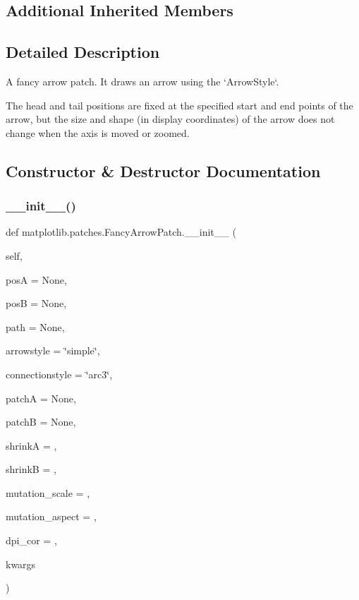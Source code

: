 \subsection*{Additional Inherited Members}


\subsection{Detailed Description}
\begin{DoxyVerb}A fancy arrow patch. It draws an arrow using the `ArrowStyle`.

The head and tail positions are fixed at the specified start and end points
of the arrow, but the size and shape (in display coordinates) of the arrow
does not change when the axis is moved or zoomed.
\end{DoxyVerb}
 

\subsection{Constructor \& Destructor Documentation}
\mbox{\label{classmatplotlib_1_1patches_1_1FancyArrowPatch_a88ac40d08aa4dfd3f50e747d8036cb14}} 
\subsubsection{\texorpdfstring{\+\_\+\+\_\+init\+\_\+\+\_\+()}{\_\_init\_\_()}}
{\footnotesize\ttfamily def matplotlib.\+patches.\+Fancy\+Arrow\+Patch.\+\_\+\+\_\+init\+\_\+\+\_\+ (\begin{DoxyParamCaption}\item[{}]{self,  }\item[{}]{posA = {\ttfamily None},  }\item[{}]{posB = {\ttfamily None},  }\item[{}]{path = {\ttfamily None},  }\item[{}]{arrowstyle = {\ttfamily \char`\"{}simple\char`\"{}},  }\item[{}]{connectionstyle = {\ttfamily \char`\"{}arc3\char`\"{}},  }\item[{}]{patchA = {\ttfamily None},  }\item[{}]{patchB = {\ttfamily None},  }\item[{}]{shrinkA = {},  }\item[{}]{shrinkB = {},  }\item[{}]{mutation\+\_\+scale = {},  }\item[{}]{mutation\+\_\+aspect = {},  }\item[{}]{dpi\+\_\+cor = {},  }\item[{}]{kwargs }\end{DoxyParamCaption})}

